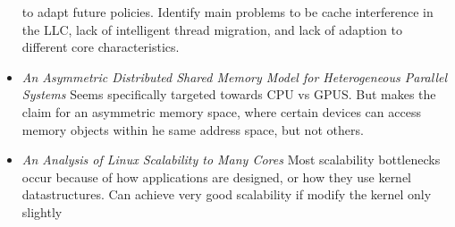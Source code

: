 \begin{itemize}
to adapt future policies. Identify main problems to be cache interference in the LLC,
lack of intelligent thread migration, and lack of adaption to different
core characteristics. \cite{knauerhase2008using}
\item \emph{An Asymmetric Distributed Shared Memory Model for Heterogeneous Parallel Systems}
Seems specifically targeted towards CPU vs GPUS. But makes the claim for an asymmetric
memory space, where certain devices can access memory objects within he same address space,
but not others. \cite{Gelado:2010:ADS:1736020.1736059}
\item \emph{An Analysis of Linux Scalability to Many Cores} Most scalability bottlenecks
occur because of how applications are designed, or how they use kernel datastructures.
Can achieve very good scalability if modify the kernel only slightly \cite{boyd2010analysis} 
\end{itemize} 
